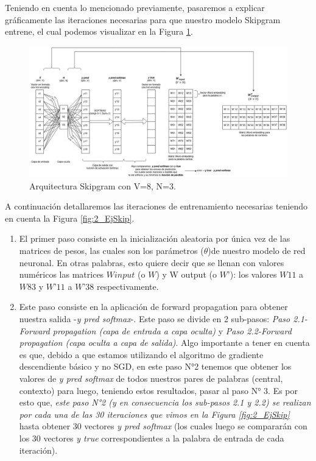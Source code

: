\documentclass[12pt,a4paper]{article}
\begin{document}
\begin{sloppypar}
Teniendo en cuenta lo mencionado previamente, pasaremos a explicar gráficamente las iteraciones necesarias para que nuestro modelo Skipgram entrene, el cual podemos visualizar en la Figura \ref{fig:4_EjSkip}.

\begin{figure}[H]    %
\centering
\includegraphics[width=1\textwidth]{images/Ejemplo_Skipgram/4_EjSkip.png}
\caption{Arquitectura Skipgram con V=8, N=3.} 
\label{fig:4_EjSkip}
\end{figure}

A continuación detallaremos las iteraciones de entrenamiento necesarias teniendo en cuenta la Figura \ref{fig:2_EjSkip}. 

\begin{enumerate}
      
\item El primer paso consiste en la inicialización aleatoria por única vez de las matrices de pesos, las cuales son los parámetros ($\theta$)de nuestro modelo de red neuronal. En otras palabras, esto quiere decir que se llenan con valores numéricos las matrices $W input$ (o $W$) y W output (o $W’$): los valores $W11$ a $W83$ y $W’11$ a $W’38$ respectivamente.
\item Este paso consiste en la aplicación de forward propagation para obtener nuestra salida -\textit{y pred softmax}-. Este paso se divide en 2 sub-pasos: \textit{Paso 2.1-Forward propagation (capa de entrada a capa oculta)} y \textit{Paso 2.2-Forward propagation (capa oculta a capa de salida)}.
Algo importante a tener en cuenta es que, debido a que estamos utilizando el algoritmo de gradiente descendiente básico y no SGD, en este paso N°2 tenemos que obtener los valores de \textit{y pred softmax} de todos nuestros pares de palabras (central, contexto) para luego, teniendo estos resultados, pasar al paso N° 3. Es por esto que, \textit{este paso N°2 (y en consecuencia los sub-pasos 2.1 y 2.2) se realizan por cada una de las 30 iteraciones que vimos en la Figura \ref{fig:2_EjSkip} } hasta obtener 30 vectores \textit{y pred softmax} (los cuales luego se compararán con los 30 vectores \textit{y true} correspondientes a la palabra de entrada de cada iteración).
      \begin{itemize}
      

\end{itemize}
\end{enumerate}
\end{sloppypar}
\end{document}
